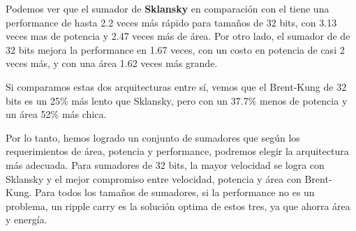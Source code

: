 Podemos ver que el sumador de \textbf{Sklansky} en comparación con el  tiene una performance de hasta 2.2 veces más rápido para tamaños de 32 bits, con 3.13 veces mas de potencia y 2.47 veces más de área. Por otro lado, el sumador de  de 32 bits mejora la performance en 1.67 veces, con un costo en potencia de casi 2 veces más, y con una área 1.62 veces más grande. 

Si comparamos estas dos arquitecturas entre sí, vemos que el Brent-Kung de 32 bits es un 25$\%$ más lento que Sklansky, pero con un 37.7$\%$ menos de potencia y un área 52$\%$ más chica.

Por lo tanto, hemos logrado un conjunto de sumadores que según los requerimientos de área, potencia y performance, podremos elegir la arquitectura más adecuada. Para sumadores de 32 bits, la mayor velocidad se logra con Sklansky y el mejor compromiso entre velocidad, potencia y área con Brent-Kung. Para todos los tamaños de sumadores, si la performance no es un problema, un ripple carry es la solución optima de estos tres, ya que ahorra área y energía.





